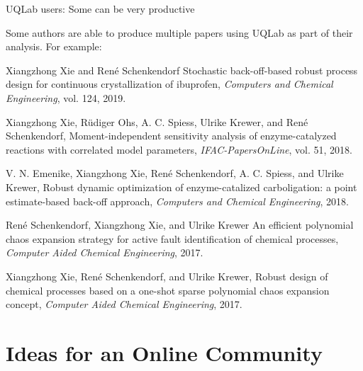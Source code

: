 \documentclass[]{rsuqbeamernew}
\begin{document}
\begin{frame}[t]{UQLab users: Some can be very productive}
  
Some authors are able to produce multiple papers using UQLab as part of their analysis.
For example:

  \begin{thebibliography}{Dijkstra, 1982}
    \footnotesize{
    Xiangzhong Xie and Ren\'e Schenkendorf
    \newblock Stochastic back-off-based robust process design for continuous crystallization of ibuprofen, {\em Computers and Chemical Engineering}, vol. 124, 2019.
    
    Xiangzhong Xie, R\"udiger Ohs, A. C. Spiess, Ulrike Krewer, and Ren\'e Schenkendorf,
    \newblock Moment-independent sensitivity analysis of enzyme-catalyzed reactions with correlated model parameters, {\em IFAC-PapersOnLine}, vol. 51, 2018.
    
    V. N. Emenike, Xiangzhong Xie, Ren\'e Schenkendorf, A. C. Spiess, and Ulrike Krewer,
    \newblock Robust dynamic optimization of enzyme-catalized carboligation: a point estimate-based back-off approach, {\em Computers and Chemical Engineering}, 2018.
  
    Ren\'e Schenkendorf, Xiangzhong Xie, and Ulrike Krewer
    \newblock An efficient polynomial chaos expansion strategy for active fault identification of chemical processes, {\em Computer Aided Chemical Engineering}, 2017.

    Xiangzhong Xie, Ren\'e Schenkendorf, and Ulrike Krewer,
    \newblock Robust design of chemical processes based on a one-shot sparse polynomial chaos expansion concept, {\em Computer Aided Chemical Engineering}, 2017.}
  \end{thebibliography}
\end{frame}

\section{Ideas for an Online Community}
\end{document}
